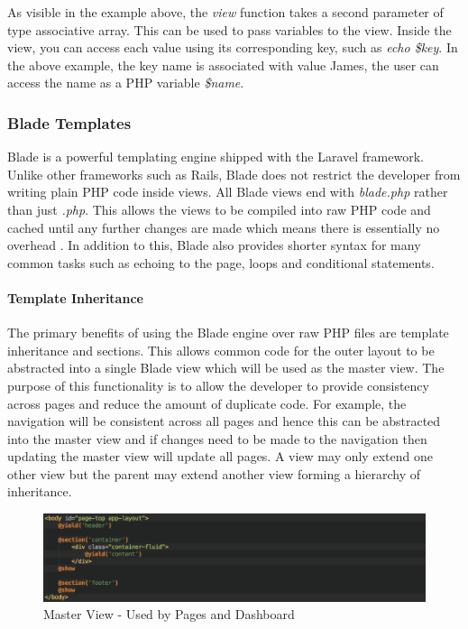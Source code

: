 As visible in the example above, the \emph{view} function takes a second parameter of type associative array. This can be used to pass variables to the view. Inside the view, you can access each value using its corresponding key, such as \emph{echo \$key}. In the above example, the key name is associated with value James, the user can access the name as a PHP variable \emph{\$name}.

\subsubsection{Blade Templates}
Blade is a powerful templating engine shipped with the Laravel framework. Unlike other frameworks such as Rails, Blade does not restrict the developer from writing plain PHP code inside views. All Blade views end with \emph{blade.php} rather than just \emph{.php}. This allows the views to be compiled into raw PHP code and cached until any further changes are made which means there is essentially no overhead \cite{Laravel:Blade}. In addition to this, Blade also provides shorter syntax for many common tasks such as echoing to the page, loops and conditional statements.


\paragraph{Template Inheritance}
The primary benefits of using the Blade engine over raw PHP files are template inheritance and sections. This allows common code for the outer layout to be abstracted into a single Blade view which will be used as the master view. The purpose of this functionality is to allow the developer to provide consistency across pages and reduce the amount of duplicate code. For example, the navigation will be consistent across all pages and hence this can be abstracted into the master view and if changes need to be made to the navigation then updating the master view will update all pages. A view may only extend one other view but the parent may extend another view forming a hierarchy of inheritance. 

\begin{figure}[H]
	\centering
	\includegraphics[width=1.0\textwidth]{images/Code/Master_View}
	\caption{Master View - Used by Pages and Dashboard} \label{fig:Master_View}
\end{figure}

